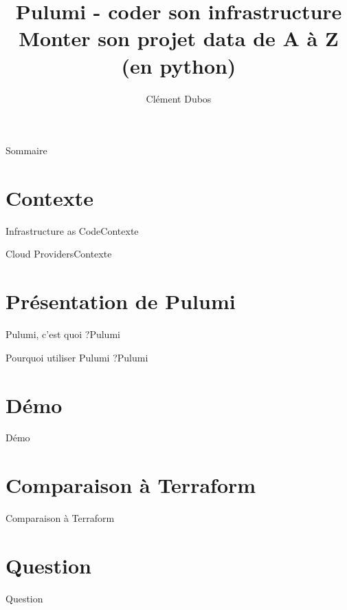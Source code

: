\documentclass[aspectratio=169, xetex, 12pt]{beamer}
\title{Pulumi - coder son infrastructure \\ \Large Monter son projet data de A à Z (en python)}
\author{Clément Dubos}
\institute{Extia}
\date{\displaydate{date}}
\begin{document}
    \maketitle

    \begin{frame}{Sommaire}
        \hfill
        \parbox[t]{.9\textwidth}{
            \begin{minipage}[c][0.2\textheight]{\textwidth}
                \Large
                \tableofcontents
            \end{minipage}
        }
    \end{frame}


    \section{Contexte}
    \begin{frame}{Infrastructure as Code}{Contexte}
    \end{frame}

    \begin{frame}{Cloud Providers}{Contexte}
    \end{frame}

    \section{Présentation de Pulumi}
    \begin{frame}{Pulumi, c'est quoi ?}{Pulumi}
    \end{frame}

    \begin{frame}{Pourquoi utiliser Pulumi ?}{Pulumi}
    \end{frame}

    \section{Démo}
    \begin{frame}{Démo}
    \end{frame}

    \section{Comparaison à Terraform}
    \begin{frame}{Comparaison à Terraform}
    \end{frame}

    \section{Question}
    \begin{frame}{Question}
    \end{frame}
\end{document}

